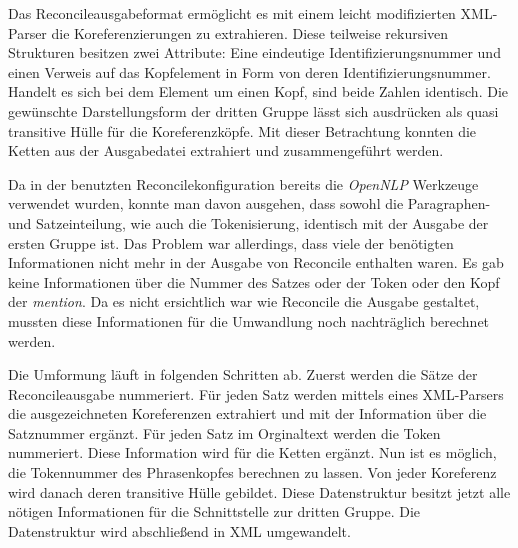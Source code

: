 Das Reconcileausgabeformat ermöglicht es mit einem leicht modifizierten XML-Parser die Koreferenzierungen zu extrahieren. Diese teilweise rekursiven Strukturen besitzen zwei Attribute: Eine eindeutige Identifizierungsnummer und einen Verweis auf das Kopfelement in Form von deren Identifizierungsnummer. Handelt es sich bei dem Element um einen Kopf, sind beide Zahlen identisch. Die gewünschte Darstellungsform der dritten Gruppe lässt sich ausdrücken als quasi transitive Hülle für die Koreferenzköpfe. Mit dieser Betrachtung konnten die Ketten aus der Ausgabedatei extrahiert und zusammengeführt werden.

Da in der benutzten Reconcilekonfiguration bereits die \emph{OpenNLP} Werkzeuge verwendet wurden, konnte man davon ausgehen, dass sowohl die Paragraphen- und Satzeinteilung, wie auch die Tokenisierung, identisch mit der Ausgabe der ersten Gruppe ist. Das Problem war allerdings, dass viele der benötigten Informationen nicht mehr in der Ausgabe von Reconcile enthalten waren. Es gab keine Informationen über die Nummer des Satzes oder der Token oder den Kopf der \emph{mention}. Da es nicht ersichtlich war wie Reconcile die Ausgabe gestaltet, mussten diese Informationen für die Umwandlung noch nachträglich berechnet werden.

Die Umformung läuft in folgenden Schritten ab. Zuerst werden die Sätze der Reconcileausgabe nummeriert. Für jeden Satz werden mittels eines XML-Parsers die ausgezeichneten Koreferenzen extrahiert und mit der Information über die Satznummer ergänzt. Für jeden Satz im Orginaltext werden die Token nummeriert. Diese Information wird für die Ketten ergänzt. Nun ist es möglich, die Tokennummer des Phrasenkopfes berechnen zu lassen. Von jeder Koreferenz wird danach deren transitive Hülle gebildet. Diese Datenstruktur besitzt jetzt alle nötigen Informationen für die Schnittstelle zur dritten Gruppe. Die Datenstruktur wird abschließend in XML umgewandelt.
